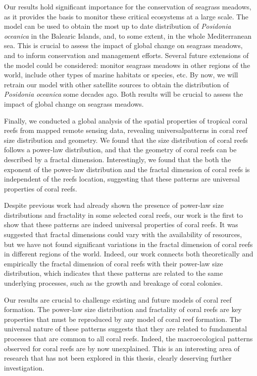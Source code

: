 Our results hold significant importance for the conservation of seagrass
meadows, as it provides the basis to monitor these critical ecosystems at a
large scale. The model can be used to obtain the most up to date distribution
of \textit{Posidonia oceanica} in the Balearic Islands, and, to some extent, in
the whole Mediterranean sea. This is crucial to assess the impact of global
change on seagrass meadows, and to inform conservation and management efforts.
Several future extensions of the model could be considered:
monitor seagrass meadows in other regions of the world, include other types of
marine habitats or species, etc. By now, we will retrain our model with other
satellite sources to obtain the distribution of \textit{Posidonia oceanica}
some decades ago. Both results will be crucial to assess the impact of global
change on seagrass meadows.

Finally, we conducted a global analysis of the spatial properties of tropical
coral reefs from mapped remote sensing data, revealing universalpatterns in
coral reef size distribution and geometry. We found that the size distribution
of coral reefs follows a power-law distribution, and that the geometry of coral
reefs can be described by a fractal dimension. Interestingly, we found that the
both the exponent of the power-law distribution and the fractal dimension of
coral reefs is independent of the reefs location, suggesting that these
patterns are universal properties of coral reefs.

Despite previous work had already shown the presence of power-law size
distributions and fractality in some selected coral reefs, our work is the
first to show that these patterns are indeed universal properties of coral
reefs. It was suggested that fractal dimensions could vary with the
availability of resources, but we have not found significant variations in the
fractal dimension of coral reefs in different regions of the world. Indeed, our
work connects both theoretically and empirically the fractal dimension of coral
reefs with their power-law size distribution, which indicates that these
patterns are related to the same underlying processes, such as the growth and
breakage of coral colonies.

Our results are crucial to challenge existing and future models of coral reef
formation. The power-law size distribution and fractality of coral reefs are
key properties that must be reproduced by any model of coral reef formation.
The universal nature of these patterns suggests that they are related to
fundamental processes that are common to all coral reefs. Indeed, the
macroecological patterns observed for coral reefs are by now unexplained. This
is an interesting area of research that has not been explored in this thesis,
clearly deserving further investigation.